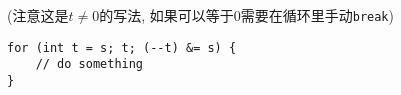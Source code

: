 (注意这是$t\ne 0$的写法, 如果可以等于$0$需要在循环里手动\texttt{break})
\begin{verbatim}
for (int t = s; t; (--t) &= s) {
    // do something
}
\end{verbatim}